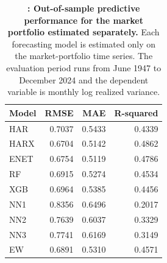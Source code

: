 \begin{table}[htbp]
\centering\footnotesize
\captionsetup{justification=raggedright,labelsep=none,singlelinecheck=false,labelformat=boldlabel}
\renewcommand{\arraystretch}{1.15}
\setlength{\tabcolsep}{4pt}
\caption[Out-of-sample predictive performance for the market portfolio estimated separately.]{\footnotesize \textbf{: Out-of-sample predictive performance for the market portfolio estimated separately.} Each forecasting model is estimated only on the market-portfolio time series. The evaluation period runs from June 1947 to December 2024 and the dependent variable is monthly log realized variance.}\label{tab:rv-additional_scopes}
\begin{tabular}{lrrr}
\hline
Model & RMSE & MAE & R-squared \\
\hline
HAR & 0.7037 & 0.5433 & 0.4339 \\
HARX & 0.6704 & 0.5142 & 0.4862 \\
ENET & 0.6754 & 0.5119 & 0.4786 \\
RF & 0.6915 & 0.5274 & 0.4534 \\
XGB & 0.6964 & 0.5385 & 0.4456 \\
NN1 & 0.8356 & 0.6496 & 0.2017 \\
NN2 & 0.7639 & 0.6037 & 0.3329 \\
NN3 & 0.7741 & 0.6169 & 0.3149 \\
EW & 0.6891 & 0.5310 & 0.4571 \\
\hline
\end{tabular}
\end{table}
